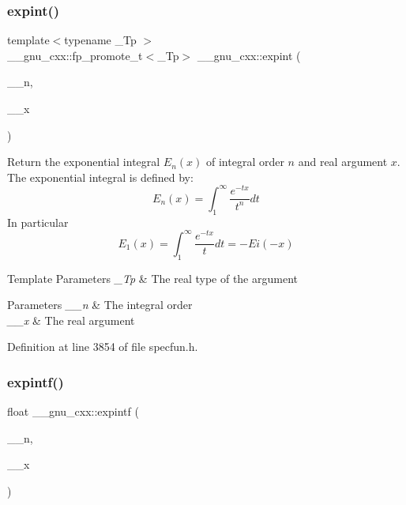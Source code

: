 \subsubsection{\texorpdfstring{expint()}{expint()}}
{\footnotesize\ttfamily template$<$typename \+\_\+\+Tp $>$ \\
\+\_\+\+\_\+gnu\+\_\+cxx\+::fp\+\_\+promote\+\_\+t$<$\+\_\+\+Tp$>$ \+\_\+\+\_\+gnu\+\_\+cxx\+::expint (\begin{DoxyParamCaption}\item[{unsigned int}]{\+\_\+\+\_\+n,  }\item[{\+\_\+\+Tp}]{\+\_\+\+\_\+x }\end{DoxyParamCaption})\hspace{0.3cm}{\ttfamily [inline]}}

Return the exponential integral $ E_n(x) $ of integral order $ n $ and real argument $ x $. The exponential integral is defined by\+: \[ E_n(x) = \int_1^\infty \frac{e^{-tx}}{t^n}dt \] In particular \[ E_1(x) = \int_1^\infty \frac{e^{-tx}}{t}dt = -Ei(-x) \]


\begin{DoxyTemplParams}{Template Parameters}
{\em \+\_\+\+Tp} & The real type of the argument \\
\hline
\end{DoxyTemplParams}

\begin{DoxyParams}{Parameters}
{\em \+\_\+\+\_\+n} & The integral order \\
\hline
{\em \+\_\+\+\_\+x} & The real argument \\
\hline
\end{DoxyParams}


Definition at line 3854 of file specfun.\+h.

\mbox{\label{group__gnu__math__spec__func_ga85751691a29807d99e990fcba61312f3}} 
\subsubsection{\texorpdfstring{expintf()}{expintf()}}
{\footnotesize\ttfamily float \+\_\+\+\_\+gnu\+\_\+cxx\+::expintf (\begin{DoxyParamCaption}\item[{unsigned int}]{\+\_\+\+\_\+n,  }\item[{float}]{\+\_\+\+\_\+x }\end{DoxyParamCaption})\hspace{0.3cm}{\ttfamily [inline]}}

